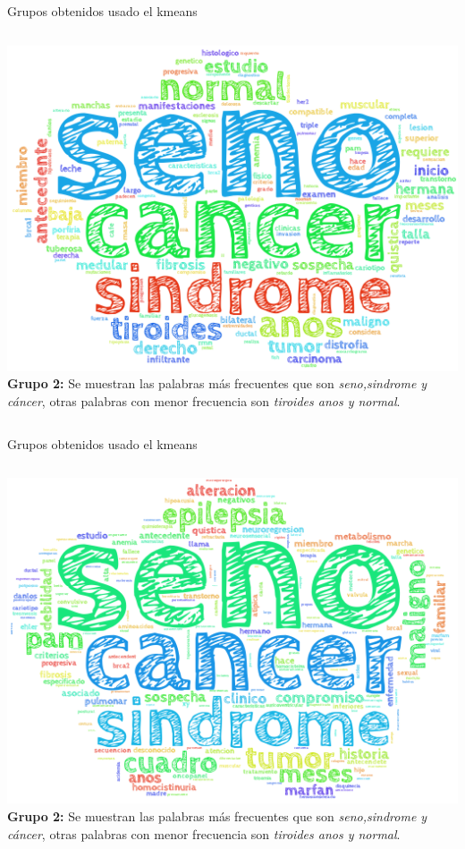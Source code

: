 \documentclass[xcolor=dvipsnames]{beamer}
\begin{document}
\begin{frame}{Grupos obtenidos usado el kmeans}
\begin{columns}
             \centering
             \includegraphics[width=1\textwidth]{cluster2.png}
           \justifying
              \textbf{Grupo 2:} Se muestran las palabras más frecuentes que son \textit{seno,sindrome y cáncer}, otras palabras con menor frecuencia son \textit{tiroides anos y normal}.
         \end{columns}
\end{frame}

\begin{frame}{Grupos obtenidos usado el kmeans}
\begin{columns}
             \centering
             \includegraphics[width=1\textwidth]{cluster3.png}
           \justifying
              \textbf{Grupo 2:} Se muestran las palabras más frecuentes que son \textit{seno,sindrome y cáncer}, otras palabras con menor frecuencia son \textit{tiroides anos y normal}.
         \end{columns}
\end{frame}
\end{document}
